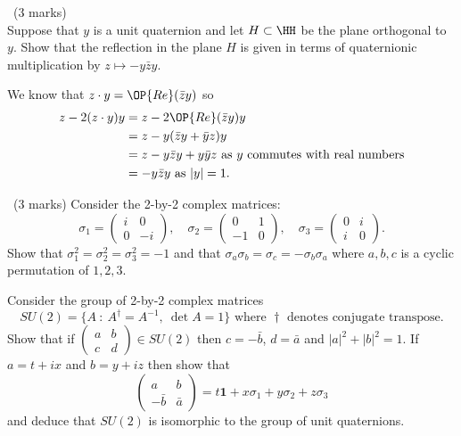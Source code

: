 \documentclass[12pt]{article}
\begin{document}
\newpage

\begin{question}\ (3 marks)\\
  Suppose that $y$ is a unit quaternion and let $H\subset\HH$ be the plane orthogonal to $y$. Show that the reflection in the plane $H$ is given in terms of quaternionic multiplication by $z\mapsto -y\bar{z}y$.
\end{question}

\begin{answer}
  We know that $z\cdot y=\OP{Re}(\bar{z}y)$ so
  \begin{align*}
    z-2(z\cdot y)y&=z-2\OP{Re}(\bar{z}y)y\\
    &=z-y(\bar{z}y+\bar{y}z)y\\
    &=z-y\bar{z}y+y\bar{y}z\mbox{ as }y\mbox{ commutes with real numbers}\\
    &=-y\bar{z}y\mbox{ as }|y|=1.
  \end{align*}
\end{answer}
\newpage

\vspace{1cm}

\begin{question}\ (3 marks)
  Consider the 2-by-2 complex matrices:
  \[\sigma_1=\left(\begin{array}{cc}
    i & 0\\
    0 & -i
  \end{array}\right),\quad\sigma_2=\left(\begin{array}{cc}
    0 & 1\\
    -1 & 0
  \end{array}\right),\quad\sigma_3=\left(\begin{array}{cc}
    0 & i\\
    i & 0
  \end{array}\right).\]
  Show that $\sigma_1^2=\sigma_2^2=\sigma_3^2=-1$ and that $\sigma_a\sigma_b=\sigma_c=-\sigma_b\sigma_a$ where $a,b,c$ is a cyclic permutation of $1,2,3$.

  Consider the group of 2-by-2 complex matrices
  \[SU(2)=\{A\ :\ A^{\dagger}=A^{-1},\ \det A=1\}\mbox{ where }\dagger\mbox{ denotes conjugate transpose.}\]
  Show that if $\left(\begin{array}{cc}a & b\\ c & d\end{array}\right)\in SU(2)$ then $c=-\bar{b}$, $d=\bar{a}$ and $|a|^2+|b|^2=1$. If $a=t+ix$ and $b=y+iz$ then show that
    \[\left(\begin{array}{cc}a&b\\-\bar{b}&\bar{a}\end{array}\right)=t\mathbf{1}+x\sigma_1+y\sigma_2+z\sigma_3\]
    and deduce that $SU(2)$ is isomorphic to the group of unit quaternions.
\end{question}
\end{document}
